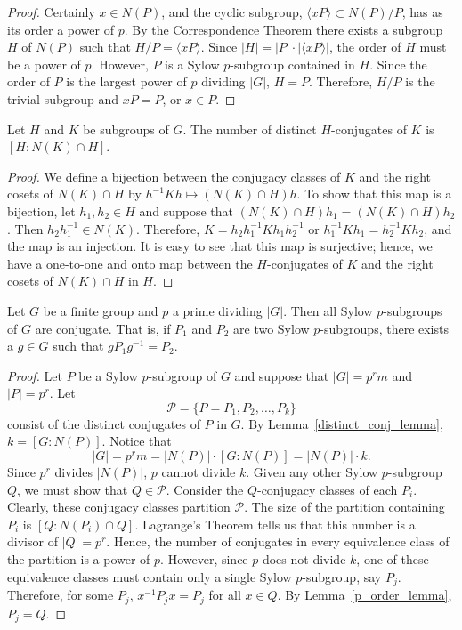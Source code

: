  
\begin{proof}
Certainly $x \in N(P)$, and the cyclic subgroup, $\langle xP \rangle
\subset N(P)/P$, has as its order a power of $p$. By the Correspondence
Theorem there exists a subgroup $H$ of $N(P)$ such that $H/P = \langle
xP \rangle$. Since $|H| = |P| \cdot |\langle xP \rangle|$, the order
of $H$ must be a power of $p$. However, $P$ is a Sylow $p$-subgroup
contained in $H$. Since the order of $P$ is the largest power of $p$
dividing $|G|$, $H=P$.  Therefore,  $H/P$ is the trivial subgroup and
$xP = P$, or $x \in P$. 
\end{proof}
 
 
\begin{lemma}\label{distinct_conj_lemma}
Let $H$ and $K$ be subgroups of $G$. The number of distinct
$H$-conjugates of $K$ is $[H:N(K) \cap H]$. 
\end{lemma}
 
 
\begin{proof}
We define a bijection between the conjugacy classes of $K$ and the
right cosets of $N(K) \cap H$ by $h^{-1}Kh \mapsto (N(K) \cap H)h$.
To show that this map is a bijection, let $h_1, h_2 \in H$ and suppose
that $(N(K) \cap H)h_1 = (N(K) \cap H)h_2$. Then $h_2 h_1^{-1} \in
N(K)$. Therefore, $K = h_2 h_1^{-1} K h_1 h_2^{-1}$ or $h_1^{-1} K h_1
= h_2^{-1} K h_2$, and the map is an injection.  It is easy to see
that this map is surjective; hence, we have a one-to-one and onto map
between the $H$-conjugates of $K$ and the right cosets of $N(K) \cap
H$ in $H$.
\end{proof}
 
 
\begin{theorem}
Let $G$ be a finite group and $p$ a prime dividing $|G|$. Then all
Sylow $p$-subgroups of $G$ are conjugate. That is, if $P_1$ and $P_2$
are two Sylow $p$-subgroups, there exists a $g \in G$ such that $g P_1
g^{-1} = P_2$. 
\end{theorem}
 
 
\begin{proof}
Let $P$ be a Sylow $p$-subgroup of $G$ and suppose that $|G|=p^r m$
and $|P|=p^r$. Let 
\[
{\mathcal P} = \{ P = P_1, P_2, \ldots, P_k \}
\]
consist of the distinct conjugates of $P$ in $G$.  By Lemma~\ref{distinct_conj_lemma}, $k =
[G: N(P)]$. Notice that 
\[
|G|= p^r m = |N(P)| \cdot [G: N(P)]= |N(P)| \cdot k.
\]
Since $p^r$ divides $|N(P)|$, $p$ cannot divide $k$. Given any other
Sylow $p$-subgroup $Q$, we must show that $Q \in {\mathcal P}$. Consider
the $Q$-conjugacy classes of each $P_i$. Clearly, these conjugacy
classes partition ${\mathcal P}$. The size of the partition containing
$P_i$ is $[Q :N(P_i) \cap Q]$. Lagrange's Theorem tells us that this
number is a divisor of $|Q|= p^r$. Hence, the number of conjugates in
every equivalence class of the partition is a power of $p$. However,
since $p$ does not divide $k$, one of these equivalence classes must
contain only a single Sylow $p$-subgroup, say $P_j$. Therefore, for
some $P_j$, $x^{-1} P_j x = P_j$ for all $x \in Q$. By Lemma~\ref{p_order_lemma},
$P_j = Q$. 
\end{proof}
 
